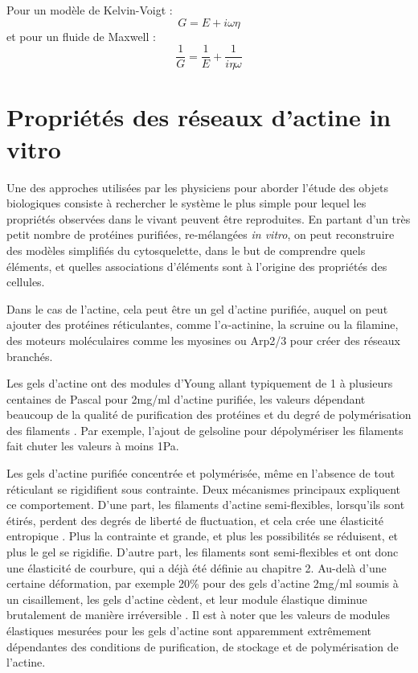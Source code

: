 \documentclass{report}
\begin{document}
Pour un modèle de Kelvin-Voigt : 
$$ G=E+ i \omega \eta$$
et pour un fluide de Maxwell : 
$$ \frac{1}{G} = \frac{1}{E} + \frac{1}{i \eta \omega}$$


\section{Propriétés des réseaux d'actine in vitro}

Une des approches utilisées par les physiciens pour aborder l'étude des objets biologiques consiste à rechercher le système le plus simple pour lequel les propriétés observées dans le vivant peuvent être reproduites. 
En partant d'un très petit nombre de protéines purifiées, re-mélangées \textit{in vitro}, on peut reconstruire des modèles simplifiés du cytosquelette, dans le but de comprendre quels éléments, et quelles associations d'éléments sont à l'origine des propriétés des cellules. 

Dans le cas de l'actine, cela peut être un gel d'actine purifiée, auquel on peut ajouter des protéines réticulantes, comme l'$\alpha$-actinine, la scruine ou la filamine, des moteurs moléculaires comme les myosines ou Arp2/3 pour créer des réseaux branchés. 

Les gels d'actine ont des modules d'Young allant typiquement de 1 à plusieurs centaines de Pascal pour 2mg/ml d'actine purifiée, les valeurs dépendant beaucoup de la qualité de purification des protéines et du degré de polymérisation des filaments \cite{janmey_1994}. Par exemple, l'ajout de gelsoline pour dépolymériser les filaments fait chuter les valeurs à moins 1Pa. 

Les gels d'actine purifiée concentrée et polymérisée, même en l'absence de tout réticulant se rigidifient sous contrainte. Deux mécanismes principaux expliquent ce comportement. 
D'une part, les filaments d'actine semi-flexibles, lorsqu'ils sont étirés, perdent des degrés de liberté de fluctuation, et cela crée une élasticité entropique \cite{storm_2005}. Plus la contrainte et grande, et plus les possibilités se réduisent, et plus le gel se rigidifie. 
D'autre part, les filaments sont semi-flexibles et ont donc une élasticité de courbure, qui a déjà été définie au chapitre 2. 
Au-delà d'une certaine déformation, par exemple 20\% pour des gels d'actine 2mg/ml soumis à un cisaillement, les gels d'actine cèdent, et leur module élastique diminue brutalement de manière irréversible \cite{janmey_1994}.
Il est à noter que les valeurs de modules élastiques mesurées pour les gels d'actine sont apparemment extrêmement dépendantes des conditions de purification, de stockage et de polymérisation de l'actine. 
\end{document}
